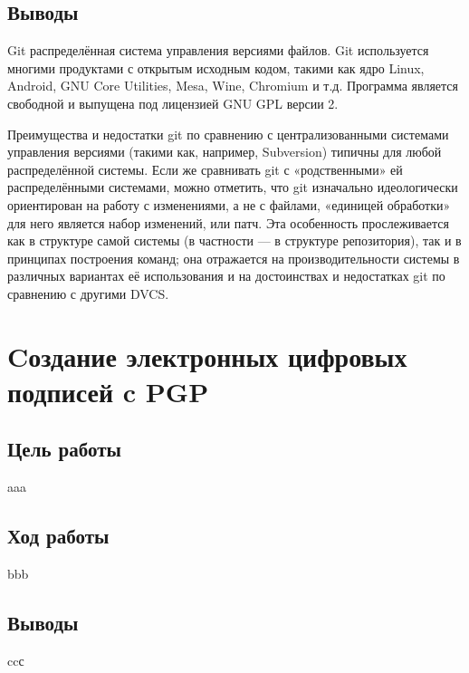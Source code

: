 \documentclass[a4paper, 12pt]{article}		%
\begin{document}
\subsection{Выводы}

Git распределённая система управления версиями файлов. Git используется многими продуктами с открытым исходным кодом, такими как ядро Linux, Android, GNU Core Utilities, Mesa, Wine, Chromium и т.д. Программа является свободной и выпущена под лицензией GNU GPL версии 2.

Преимущества и недостатки git по сравнению с централизованными системами управления версиями (такими как, например, Subversion) типичны для любой распределённой системы. Если же сравнивать git с «родственными» ей распределёнными системами, можно отметить, что git изначально идеологически ориентирован на работу с изменениями, а не с файлами, «единицей обработки» для него является набор изменений, или патч. Эта особенность прослеживается как в структуре самой системы (в частности — в структуре репозитория), так и в принципах построения команд; она отражается на производительности системы в различных вариантах её использования и на достоинствах и недостатках git по сравнению с другими DVCS.

\newpage
\section{Cоздание электронных цифровых подписей c PGP}

\subsection{Цель работы}
aaa

\subsection{Ход работы}
bbb

\subsection{Выводы}

ccс
\end{document}
